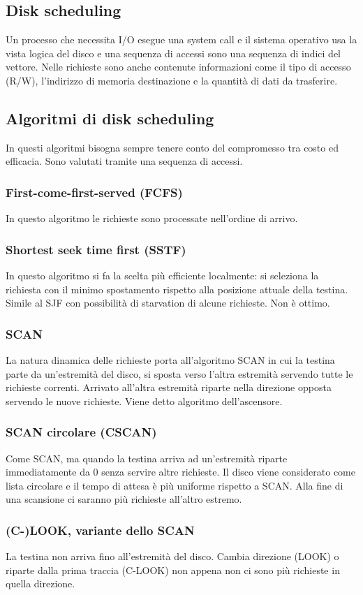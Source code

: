 \subsection{Disk scheduling}
Un processo che necessita I/O esegue una system call e il sistema operativo usa la vista logica del disco e una sequenza di accessi sono una sequenza di indici del vettore. Nelle 
richieste sono anche contenute informazioni come il tipo di accesso (R/W), l'indirizzo di memoria destinazione e la quantit\`a di dati da trasferire. 
\subsection{Algoritmi di disk scheduling}
In questi algoritmi bisogna sempre tenere conto del compromesso tra costo ed efficacia. Sono valutati tramite una sequenza di accessi. 
\subsubsection{First-come-first-served (FCFS)}
In questo algoritmo le richieste sono processate nell'ordine di arrivo. 
\subsubsection{Shortest seek time first (SSTF)}
In questo algoritmo si fa la scelta pi\`u efficiente localmente: si seleziona la richiesta con il minimo spostamento rispetto alla posizione attuale della testina. Simile al SJF con
possibilit\`a di starvation di alcune richieste. Non \`e ottimo. 
\subsubsection{SCAN}
La natura dinamica delle richieste porta all'algoritmo SCAN in cui la testina parte da un'estremit\`a del disco, si sposta verso l'altra estremit\`a servendo tutte le richieste 
correnti. Arrivato all'altra estremit\`a riparte nella direzione opposta servendo le nuove richieste. Viene detto algoritmo dell'ascensore. 
\subsubsection{SCAN circolare (CSCAN)}
Come SCAN, ma quando la testina arriva ad un'estremit\`a riparte immediatamente da $0$ senza servire altre richieste. Il disco viene considerato come lista circolare e il tempo di 
attesa \`e pi\`u uniforme rispetto a SCAN. Alla fine di una scansione ci saranno pi\`u richieste all'altro estremo. 
\subsubsection{(C-)LOOK, variante dello SCAN}
La testina non arriva fino all'estremit\`a del disco. Cambia direzione (LOOK) o riparte dalla prima traccia (C-LOOK) non appena non ci sono pi\`u richieste in quella direzione.
